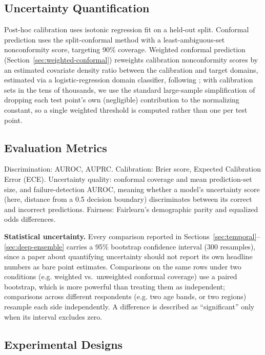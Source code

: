 \documentclass[11pt]{article}
\begin{document}
\subsection{Uncertainty Quantification}

Post-hoc calibration uses isotonic regression fit on a held-out split. Conformal prediction uses the split-conformal method with a least-ambiguous-set nonconformity score, targeting 90\% coverage. Weighted conformal prediction (Section~\ref{sec:weighted-conformal}) reweights calibration nonconformity scores by an estimated covariate density ratio between the calibration and target domains, estimated via a logistic-regression domain classifier, following \citet{tibshirani2019conformal}; with calibration sets in the tens of thousands, we use the standard large-sample simplification of dropping each test point's own (negligible) contribution to the normalizing constant, so a single weighted threshold is computed rather than one per test point.

\subsection{Evaluation Metrics}
\label{sec:metrics}

Discrimination: AUROC, AUPRC. Calibration: Brier score, Expected Calibration Error (ECE). Uncertainty quality: conformal coverage and mean prediction-set size, and failure-detection AUROC, meaning whether a model's uncertainty score (here, distance from a 0.5 decision boundary) discriminates between its correct and incorrect predictions. Fairness: Fairlearn's demographic parity and equalized odds differences.

\textbf{Statistical uncertainty.} Every comparison reported in Sections~\ref{sec:temporal}--\ref{sec:deep-ensemble} carries a 95\% bootstrap confidence interval (300 resamples), since a paper about quantifying uncertainty should not report its own headline numbers as bare point estimates. Comparisons on the same rows under two conditions (e.g. weighted vs.\ unweighted conformal coverage) use a paired bootstrap, which is more powerful than treating them as independent; comparisons across different respondents (e.g. two age bands, or two regions) resample each side independently. A difference is described as ``significant'' only when its interval excludes zero.

\subsection{Experimental Designs}
\end{document}
